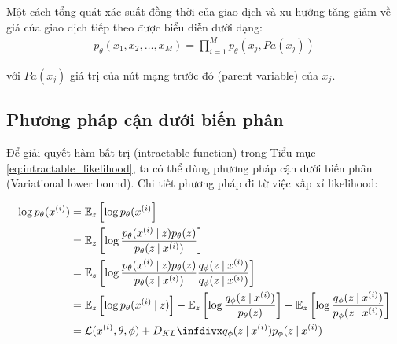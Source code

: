 Một cách tổng quát xác suất đồng thời của giao dịch và xu hướng tăng giảm về giá của giao dịch tiếp theo được biểu diễn dưới dạng:
\begin{align*}
p_\theta(x_1, x_2, \dots, x_M) = \prod_{i=1}^{M}p_\theta(x_j, Pa(x_j))
\end{align*}

với $Pa(x_j)$ giá trị của nút mạng trước đó (parent variable) của $x_j$.
\subsection{Phương pháp cận dưới biến phân}\label{variational-lower-bound}
Để giải quyết hàm bất trị (intractable function) trong Tiểu mục \ref{eq:intractable_likelihood}, ta có thể dùng phương pháp cận dưới biến phân \cite[trang~198]{intro_variational} (Variational lower bound). Chi tiết phương pháp đi từ việc xấp xỉ likelihood:

\begin{align}
    \log p_\theta(x^{(i)})
    &= \mathbb{E}_{z} \left[\log p_\theta(x^{(i)} \right] \label{eq:11}\\
    &= \mathbb{E}_{z} \left[\log \frac{p_\theta(x^{(i)} \given z)p_\theta(z)}
    {p_\theta(z \given x^{(i)})} \right] \label{eq:12}\\
    &= \mathbb{E}_{z} \left[\log \frac{p_\theta(x^{(i)} \given z)p_\theta(z)}
    {p_\theta(z \given x^{(i)})}  
    \frac{q_\phi(z\given x^{(i)})} {q_\phi(z\given x^{(i)})} 
    \right]\\
    &=\mathbb{E}_{z} \left[\log p_\theta(x^{(i)} \given z) \right]
    - \mathbb{E}_{z} \left[\log \frac{q_\phi(z \given x^{(i)})}{p_\theta(z)} \right]
    + \mathbb{E}_{z} \left[\log \frac{q_\phi(z \given x^{(i)})}{p_\phi(z \given x^{(i)})} \right]\\
    &= \mathcal{L}(x^{(i)}, \theta, \phi) 
    + \Dkl{q_\phi(z \given x^{(i)})}{p_\phi(z \given x^{(i)})} 
\end{align}

